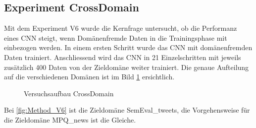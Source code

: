 \subsection{Experiment CrossDomain}
Mit dem Experiment V6 wurde die Kernfrage untersucht, ob die Performanz eines CNN steigt, wenn Domänenfremde Daten in die Trainingsphase mit einbezogen werden.
In einem ersten Schritt wurde das CNN mit domänenfremden Daten trainiert. Anschliessend wird das CNN in 21 Einzelschritten mit jeweils zusätzlich 400 Daten von der Zieldomäne weiter trainiert. Die genaue Aufteilung auf die verschiedenen Domänen ist im Bild \ref{fig:Method_CrossDomain} ersichtlich.
\begin{figure}[H]
	\centering
	\caption{Versuchsaufbau CrossDomain}
	\label{fig:Method_CrossDomain}
\end{figure}

Bei \ref{fig:Method_V6} ist die Zieldomäne SemEval\_tweets, die Vorgehensweise für die Zieldomäne MPQ\_news ist die Gleiche.
